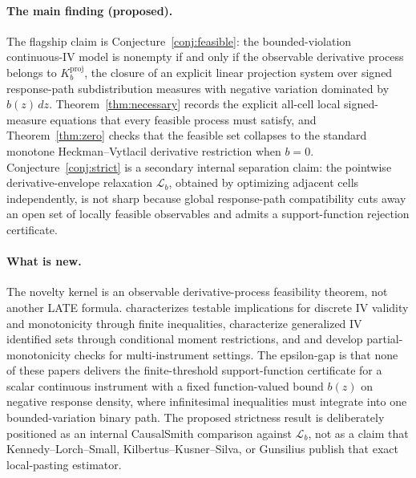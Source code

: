 \documentclass[11pt]{article}
\theoremstyle{definition}
\theoremstyle{plain}
\theoremstyle{remark}
\begin{document}
\paragraph{The main finding (proposed).}
The flagship claim is Conjecture~\ref{conj:feasible}: the bounded-violation continuous-IV model is nonempty if and only if the observable derivative process belongs to \(K_b^{\mathrm{proj}}\), the closure of an explicit linear projection system over signed response-path subdistribution measures with negative variation dominated by \(b(z)\,dz\).  Theorem~\ref{thm:necessary} records the explicit all-cell local signed-measure equations that every feasible process must satisfy, and Theorem~\ref{thm:zero} checks that the feasible set collapses to the standard monotone Heckman--Vytlacil derivative restriction when \(b=0\).  Conjecture~\ref{conj:strict} is a secondary internal separation claim: the pointwise derivative-envelope relaxation \(\mathcal L_b\), obtained by optimizing adjacent cells independently, is not sharp because global response-path compatibility cuts away an open set of locally feasible observables and admits a support-function rejection certificate.

\paragraph{What is new.}
The novelty kernel is an observable derivative-process feasibility theorem, not another LATE formula.  \citet{Kitagawa2015} characterizes testable implications for discrete IV validity and monotonicity through finite inequalities, \citet{ChesherRosen2017} characterize generalized IV identified sets through conditional moment restrictions, and \citet{MogstadTorgovitskyWalters2021} and \citet{JiangSun2023PartialMonotonicityTest} develop partial-monotonicity checks for multi-instrument settings.  The epsilon-gap is that none of these papers delivers the finite-threshold support-function certificate for a scalar continuous instrument with a fixed function-valued bound \(b(z)\) on negative response density, where infinitesimal inequalities must integrate into one bounded-variation binary path.  The proposed strictness result is deliberately positioned as an internal CausalSmith comparison against \(\mathcal L_b\), not as a claim that Kennedy--Lorch--Small, Kilbertus--Kusner--Silva, or Gunsilius publish that exact local-pasting estimator.
\end{document}
